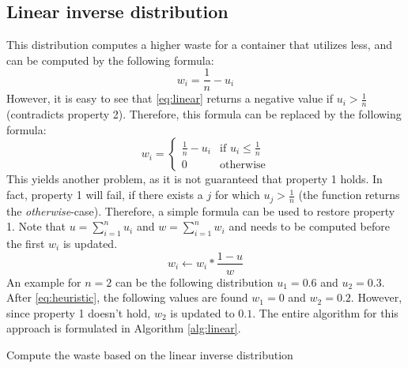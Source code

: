 \subsection{Linear inverse distribution} \label{sec:linear}
This distribution computes a higher waste for a container that utilizes less, and can be computed by the following formula:
\begin{equation} \label{eq:linear}
w_i = \frac{1}{n} - u_i
\end{equation}
However, it is easy to see that \autoref{eq:linear} returns a negative value if $u_i > \frac{1}{n}$ (contradicts property 2). Therefore, this formula can be replaced by the following formula:
\begin{equation}\label{eq:heuristic}
w_i = \begin{cases}
\frac{1}{n} - u_i & \text{if } u_i \leq \frac{1}{n}\\
0                 & \text{otherwise}
\end{cases}
\end{equation}
This yields another problem, as it is not guaranteed that property 1 holds. In fact, property 1 will fail, if there exists a $j$ for which $u_j > \frac{1}{n}$ (the function returns the \textit{otherwise}-case). Therefore, a simple formula can be used to restore property 1. Note that $u = \sum_{i=1}^n u_i$ and $w = \sum_{i=1}^n w_i$ and needs to be computed before the first $w_i$ is updated.
\begin{equation} \label{eq:update}
    w_i \leftarrow w_i * \frac{1-u}{w}
\end{equation}
An example for $n = 2$ can be the following distribution $u_1 = 0.6$ and $u_2 = 0.3$. After \autoref{eq:heuristic}, the following values are found $w_1 = 0$ and $w_2 = 0.2$. However, since property 1 doesn't hold, $w_2$ is updated to $0.1$. The entire algorithm for this approach is formulated in Algorithm \ref{alg:linear}.

\begin{algorithm}
\caption{Compute the waste based on the linear inverse distribution}\label{alg:linear}
\end{algorithm}

